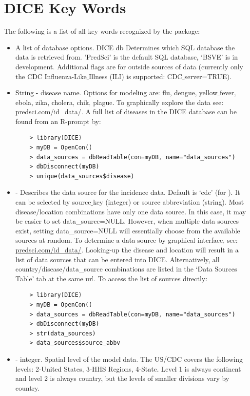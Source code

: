 \documentclass[a4paper]{article}
\begin{document}
\section{DICE Key Words}
\label{sec:keyWords}
The following is a list of all key words recognized by the  package:
\begin{itemize}
\item {} A list of database options.  DICE$\_$db Determines which SQL database the data is retrieved from.  'PredSci' is the default SQL database, `BSVE' is in development.  Additional flags are for outside sources of data (currently only the CDC Influenza-Like$\_$Illness (ILI) is supported: CDC$\_$server=TRUE).
\item {} String - disease name. Options for modeling are: flu, dengue, yellow$\_$fever, ebola, zika, cholera, chik, plague. To graphically explore the data see: \url{predsci.com/id_data/}. A full list of diseases in the DICE database can be found from an R-prompt by:
\begin{verbatim}
    > library(DICE)
    > myDB = OpenCon()
    > data_sources = dbReadTable(con=myDB, name="data_sources")
    > dbDisconnect(myDB)
    > unique(data_sources$disease)
\end{verbatim}
\item {} - Describes the data source for the incidence data. Default is `cdc' (for ). It can be selected by source$\_$key (integer) or source abbreviation (string). Most disease/location combinations have only one data source.  In this case, it may be easier to set data\_source=NULL.  However, when multiple data sources exist, setting data\_source=NULL will essentially choose from the available sources at random.  To determine a data source by graphical interface, see: \url{predsci.com/id_data/}.  Looking-up the disease and location will result in a list of data sources that can be entered into DICE.  Alternatively, all country/disease/data\_source combinations are listed in the `Data Sources Table' tab at the same url.  To access the list of sources directly:
\begin{verbatim}
    > library(DICE)
    > myDB = OpenCon()
    > data_sources = dbReadTable(con=myDB, name="data_sources")
    > dbDisconnect(myDB)
    > str(data_sources)
    > data_sources$source_abbv
\end{verbatim}
\item {} - integer. Spatial level of the model data. The US/CDC covers the following levels: 2-United States, 3-HHS Regions, 4-State.  Level 1 is always continent and level 2 is always country, but the levels of smaller divisions vary by country.

\end{itemize}
\end{document}
